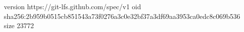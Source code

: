 version https://git-lfs.github.com/spec/v1
oid sha256:2b959b0515cb851543a73f0276a3c0e32bf37a3df69aa3953ca0edc8c069b536
size 23772
